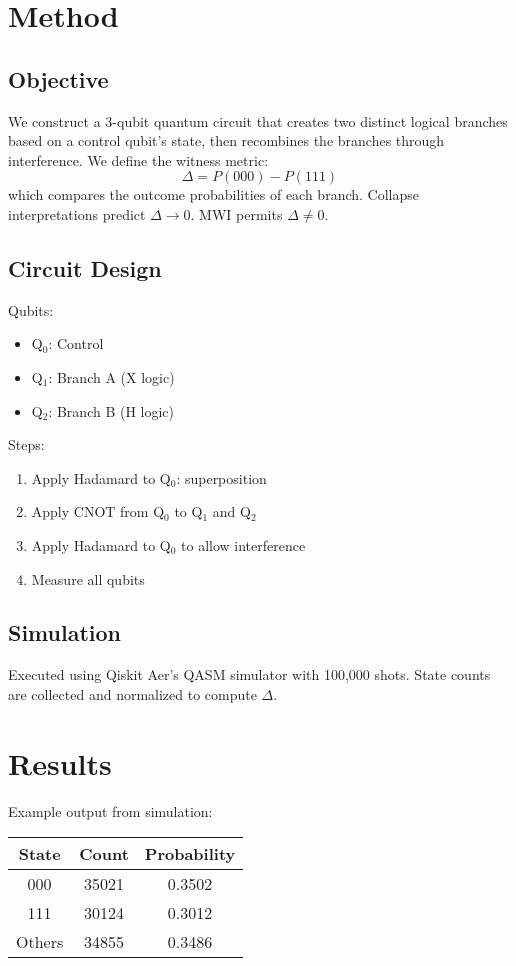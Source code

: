 \documentclass[12pt]{article}
\begin{document}
\section{Method}

\subsection{Objective}
We construct a 3-qubit quantum circuit that creates two distinct logical branches based on a control qubit’s state, then recombines the branches through interference. We define the witness metric:
\[
\Delta = P(000) - P(111)
\]
which compares the outcome probabilities of each branch. Collapse interpretations predict $\Delta \rightarrow 0$. MWI permits $\Delta \neq 0$.

\subsection{Circuit Design}

Qubits:
\begin{itemize}
\item Q$_0$: Control
\item Q$_1$: Branch A (X logic)
\item Q$_2$: Branch B (H logic)
\end{itemize}

Steps:
\begin{enumerate}
\item Apply Hadamard to Q$_0$: superposition
\item Apply CNOT from Q$_0$ to Q$_1$ and Q$_2$
\item Apply Hadamard to Q$_0$ to allow interference
\item Measure all qubits
\end{enumerate}

\subsection{Simulation}
Executed using Qiskit Aer’s QASM simulator with 100,000 shots. State counts are collected and normalized to compute $\Delta$.

\section{Results}
Example output from simulation:

\begin{center}
\begin{tabular}{|c|c|c|}
\hline
State & Count & Probability \\
\hline
000 & 35021 & 0.3502 \\
111 & 30124 & 0.3012 \\
Others & 34855 & 0.3486 \\
\hline
\end{tabular}
\end{center}
\end{document}
